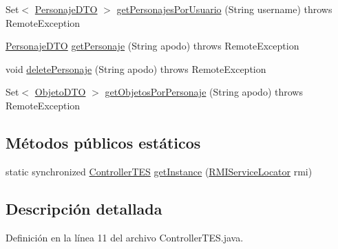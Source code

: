 \begin{DoxyCompactItemize}
\item 
Set$<$ \hyperlink{classes_1_1deusto_1_1spq_1_1_t_e_scc_1_1dto_1_1_personaje_d_t_o}{Personaje\+D\+T\+O} $>$ \hyperlink{classes_1_1deusto_1_1spq_1_1_t_e_scc_1_1cliente_1_1_controller_t_e_s_aabc84fb108ea71f05f2d01d97cbc2cc7}{get\+Personajes\+Por\+Usuario} (String username)  throws Remote\+Exception 
\item 
\hyperlink{classes_1_1deusto_1_1spq_1_1_t_e_scc_1_1dto_1_1_personaje_d_t_o}{Personaje\+D\+T\+O} \hyperlink{classes_1_1deusto_1_1spq_1_1_t_e_scc_1_1cliente_1_1_controller_t_e_s_a5016b0844fcbac2d36daef15349a5403}{get\+Personaje} (String apodo)  throws Remote\+Exception 
\item 
void \hyperlink{classes_1_1deusto_1_1spq_1_1_t_e_scc_1_1cliente_1_1_controller_t_e_s_a3c4d1f112c6ff13f58c35f6e5477009d}{delete\+Personaje} (String apodo)  throws Remote\+Exception 
\item 
Set$<$ \hyperlink{classes_1_1deusto_1_1spq_1_1_t_e_scc_1_1dto_1_1_objeto_d_t_o}{Objeto\+D\+T\+O} $>$ \hyperlink{classes_1_1deusto_1_1spq_1_1_t_e_scc_1_1cliente_1_1_controller_t_e_s_a964193b764de995d32300c98c4931bcf}{get\+Objetos\+Por\+Personaje} (String apodo)  throws Remote\+Exception 
\end{DoxyCompactItemize}
\subsection*{Métodos públicos estáticos}
\begin{DoxyCompactItemize}
\item 
static synchronized \hyperlink{classes_1_1deusto_1_1spq_1_1_t_e_scc_1_1cliente_1_1_controller_t_e_s}{Controller\+T\+E\+S} \hyperlink{classes_1_1deusto_1_1spq_1_1_t_e_scc_1_1cliente_1_1_controller_t_e_s_aa273f706656abed28640fb74d9ee166b}{get\+Instance} (\hyperlink{classes_1_1deusto_1_1spq_1_1_t_e_scc_1_1cliente_1_1_r_m_i_service_locator}{R\+M\+I\+Service\+Locator} rmi)
\end{DoxyCompactItemize}


\subsection{Descripción detallada}


Definición en la línea 11 del archivo Controller\+T\+E\+S.\+java.




